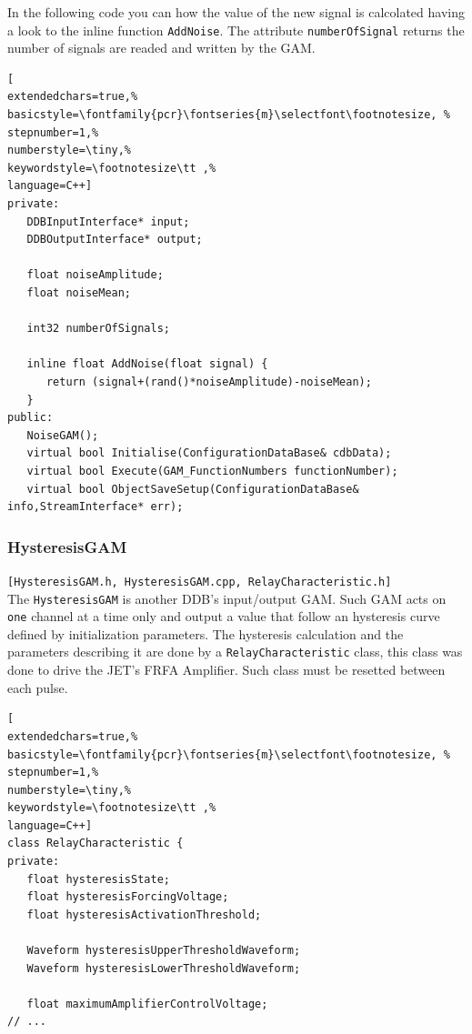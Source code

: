 In the following code you can how the value of the new signal is calcolated having a look to the inline function \texttt{AddNoise}. The attribute \texttt{numberOfSignal} returns the number of signals are readed and written by the GAM.

\begin{lstlisting}[
extendedchars=true,%
basicstyle=\fontfamily{pcr}\fontseries{m}\selectfont\footnotesize, %
stepnumber=1,%
numberstyle=\tiny,%
keywordstyle=\footnotesize\tt ,%
language=C++]
private:
   DDBInputInterface* input;
   DDBOutputInterface* output;

   float noiseAmplitude;
   float noiseMean;

   int32 numberOfSignals;

   inline float AddNoise(float signal) {
      return (signal+(rand()*noiseAmplitude)-noiseMean);
   }
public:
   NoiseGAM();
   virtual bool Initialise(ConfigurationDataBase& cdbData);
   virtual bool Execute(GAM_FunctionNumbers functionNumber);
   virtual bool ObjectSaveSetup(ConfigurationDataBase& info,StreamInterface* err);
\end{lstlisting}



\subsubsection{HysteresisGAM}
\texttt{[HysteresisGAM.h, HysteresisGAM.cpp, RelayCharacteristic.h]} \\
The \texttt{HysteresisGAM} is another DDB's input/output GAM. Such GAM acts on \texttt{one} channel at a time only and output a value that follow an hysteresis curve defined by initialization parameters. The hysteresis calculation and the parameters describing it are done by a \texttt{RelayCharacteristic} class, this class was done to drive the JET's FRFA Amplifier. Such class must be resetted between each pulse.

\begin{lstlisting}[
extendedchars=true,%
basicstyle=\fontfamily{pcr}\fontseries{m}\selectfont\footnotesize, %
stepnumber=1,%
numberstyle=\tiny,%
keywordstyle=\footnotesize\tt ,%
language=C++]
class RelayCharacteristic {
private:
   float hysteresisState;
   float hysteresisForcingVoltage;
   float hysteresisActivationThreshold;

   Waveform hysteresisUpperThresholdWaveform;
   Waveform hysteresisLowerThresholdWaveform;

   float maximumAmplifierControlVoltage;
// ...
\end{lstlisting}

